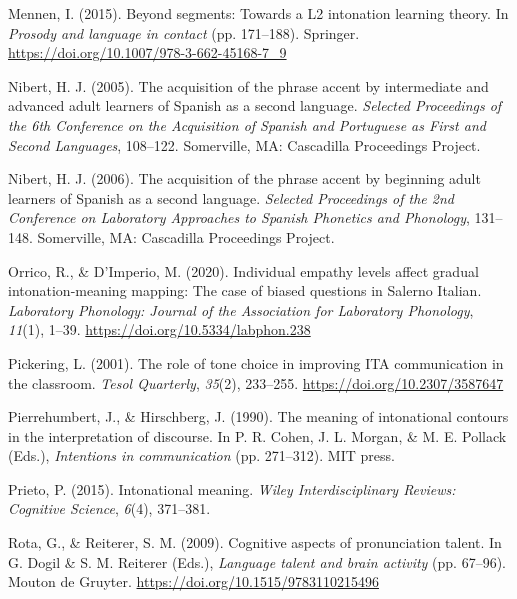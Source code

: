 \documentclass[]{article}
\newlength{\cslhangindent}
\newenvironment{CSLReferences}[2] %
 {%
  \setlength{\parindent}{0pt}
  \ifodd #1 \everypar{\setlength{\hangindent}{\cslhangindent}}\ignorespaces\fi
  \ifnum #2 > 0
  \setlength{\parskip}{#2\baselineskip}
  \fi
 }%
 {}
\begin{document}
\begin{CSLReferences}{1}{0}
\leavevmode{}%
Mennen, I. (2015). Beyond segments: {T}owards a {L}2 intonation learning theory. In \emph{Prosody and language in contact} (pp. 171--188). Springer. \url{https://doi.org/10.1007/978-3-662-45168-7_9}

\leavevmode{}%
Nibert, H. J. (2005). The acquisition of the phrase accent by intermediate and advanced adult learners of {S}panish as a second language. \emph{{Selected Proceedings of the 6th Conference on the Acquisition of Spanish and Portuguese as First and Second Languages}}, 108--122. Somerville, MA: Cascadilla Proceedings Project.

\leavevmode{}%
Nibert, H. J. (2006). The acquisition of the phrase accent by beginning adult learners of {S}panish as a second language. \emph{{Selected Proceedings of the 2nd Conference on Laboratory Approaches to Spanish Phonetics and Phonology}}, 131--148. Somerville, MA: Cascadilla Proceedings Project.

\leavevmode{}%
Orrico, R., \& D'Imperio, M. (2020). Individual empathy levels affect gradual intonation-meaning mapping: The case of biased questions in {S}alerno {I}talian. \emph{Laboratory Phonology: Journal of the Association for Laboratory Phonology}, \emph{11}(1), 1--39. \url{https://doi.org/10.5334/labphon.238}

\leavevmode{}%
Pickering, L. (2001). The role of tone choice in improving {ITA} communication in the classroom. \emph{Tesol Quarterly}, \emph{35}(2), 233--255. \url{https://doi.org/10.2307/3587647}

\leavevmode{}%
Pierrehumbert, J., \& Hirschberg, J. (1990). The meaning of intonational contours in the interpretation of discourse. In P. R. Cohen, J. L. Morgan, \& M. E. Pollack (Eds.), \emph{Intentions in communication} (pp. 271--312). {MIT} press.

\leavevmode{}%
Prieto, P. (2015). Intonational meaning. \emph{Wiley Interdisciplinary Reviews: Cognitive Science}, \emph{6}(4), 371--381.

\leavevmode{}%
Rota, G., \& Reiterer, S. M. (2009). Cognitive aspects of pronunciation talent. In G. Dogil \& S. M. Reiterer (Eds.), \emph{Language talent and brain activity} (pp. 67--96). Mouton de Gruyter. \url{https://doi.org/10.1515/9783110215496}


\end{CSLReferences}
\end{document}
